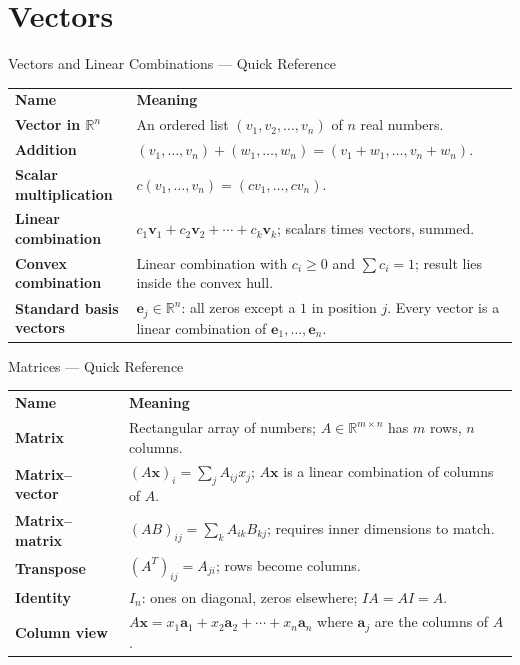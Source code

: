 

\section{Vectors}

\begin{toolkitbox}{Vectors and Linear Combinations --- Quick Reference}
\begin{tabular}{@{}p{}p{}@{}}
\textbf{Name} & \textbf{Meaning} \\
\textbf{Vector in $\mathbb{R}^n$}     & An ordered list $(v_1, v_2, \ldots, v_n)$ of $n$ real numbers. \\[4pt]
\textbf{Addition}                      & $(v_1,\ldots,v_n)+(w_1,\ldots,w_n) = (v_1+w_1,\ldots,v_n+w_n)$. \\[4pt]
\textbf{Scalar multiplication}         & $c(v_1,\ldots,v_n) = (cv_1,\ldots,cv_n)$. \\[4pt]
\textbf{Linear combination}            & $c_1\mathbf{v}_1 + c_2\mathbf{v}_2 + \cdots + c_k\mathbf{v}_k$; scalars times vectors, summed. \\[4pt]
\textbf{Convex combination}            & Linear combination with $c_i \geq 0$ and $\sum c_i = 1$; result lies inside the convex hull. \\[4pt]
\textbf{Standard basis vectors}        & $\mathbf{e}_j \in \mathbb{R}^n$: all zeros except a $1$ in position $j$. Every vector is a linear combination of $\mathbf{e}_1,\ldots,\mathbf{e}_n$. \\
\end{tabular}
\end{toolkitbox}


\begin{toolkitbox}{Matrices --- Quick Reference}
\begin{tabular}{@{}p{}p{}@{}}
\textbf{Name} & \textbf{Meaning} \\
\textbf{Matrix}            & Rectangular array of numbers; $A \in \mathbb{R}^{m \times n}$ has $m$ rows, $n$ columns. \\[4pt]
\textbf{Matrix--vector}    & $(A\mathbf{x})_i = \sum_j A_{ij} x_j$; $A\mathbf{x}$ is a linear combination of columns of $A$. \\[4pt]
\textbf{Matrix--matrix}    & $(AB)_{ij} = \sum_k A_{ik} B_{kj}$; requires inner dimensions to match. \\[4pt]
\textbf{Transpose}         & $(A^T)_{ij} = A_{ji}$; rows become columns. \\[4pt]
\textbf{Identity}          & $I_n$: ones on diagonal, zeros elsewhere; $IA = AI = A$. \\[4pt]
\textbf{Column view}       & $A\mathbf{x} = x_1\mathbf{a}_1 + x_2\mathbf{a}_2 + \cdots + x_n\mathbf{a}_n$ where $\mathbf{a}_j$ are the columns of $A$. \\
\end{tabular}
\end{toolkitbox}


